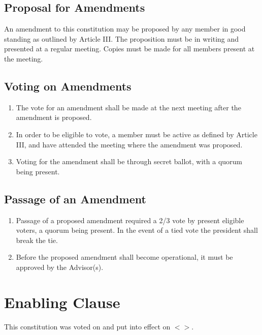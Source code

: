 \documentclass[english,11pt]{article}
\begin{document}
\subsection{Proposal for Amendments}
An amendment to this constitution may be proposed by any member in good standing as outlined by Article III.
The proposition must be in writing and presented at a regular meeting.
Copies must be made for all members present at the meeting.

\subsection{Voting on Amendments}
\begin{enumerate}[label=\Alph*.]
\item The vote for an amendment shall be made at the next meeting after the amendment is proposed.
\item In order to be eligible to vote, a member must be active as defined by Article III, and have attended the meeting where the amendment was proposed.
\item Voting for the amendment shall be through secret ballot, with a quorum being present.
\end{enumerate}

\subsection{Passage of an Amendment}
\begin{enumerate}[label=\Alph*.]
\item Passage of a proposed amendment required a 2/3 vote by present eligible voters, a quorum being present. 
    In the event of a tied vote the president shall break the tie.
\item Before the proposed amendment shall become operational, it must be approved by the Advisor(s).
\end{enumerate}

\section{Enabling Clause}
This constitution was voted on and put into effect on $<>$.
\end{document}
